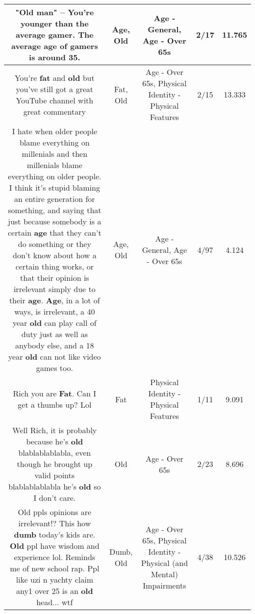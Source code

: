 \documentclass[11pt]{article}
\newlength\mylength
\begin{document}
\begin{center}
\begin{longtable}{|C{.65\mylength}|C{.30\mylength}|C{.12\mylength}|C{.12\mylength}|C{.12\mylength}|}
  \small "\textbf{Old} man" -- You're younger than the average gamer. The average \textbf{age} of gamers is around 35.\normalsize   & Age, Old & Age - General, Age - Over 65s & 2/17 & 11.765 \\  \hline
  \small You're \textbf{fat} and \textbf{old} but you've still got a great YouTube channel with great commentary\normalsize   & Fat, Old & Age - Over 65s, Physical Identity - Physical Features & 2/15 & 13.333 \\  \hline
  \small I hate when older people blame everything on millenials and then millenials blame everything on older people. I think it's stupid blaming an entire generation for something, and saying that just because somebody is a certain \textbf{age} that they can't do something or they don't know about how a certain thing works, or that their opinion is irrelevant simply due to their \textbf{age}. \textbf{Age}, in a lot of ways, is irrelevant, a 40 year \textbf{old} can play call of duty just as well as anybody else, and a 18 year \textbf{old} can not like video games too.\normalsize   & Age, Old & Age - General, Age - Over 65s & 4/97 & 4.124 \\  \hline
  \small Rich you are \textbf{Fat}. Can I get a thumbs up? Lol\normalsize   & Fat & Physical Identity - Physical Features & 1/11 & 9.091 \\  \hline
  \small Well Rich, it is probably because he's \textbf{old} blablablablabla, even though he brought up valid points blablablablabla he's \textbf{old} so I don't care.\normalsize   & Old & Age - Over 65s & 2/23 & 8.696 \\  \hline
  \small Old ppls opinions are irrelevant!? This how \textbf{dumb} today's kids are. \textbf{Old} ppl have wisdom and experience lol. Reminds me of new school rap. Ppl like uzi n yachty claim any1 over 25 is an \textbf{old} head... wtf\normalsize   & Dumb, Old & Age - Over 65s, Physical Identity - Physical (and Mental) Impairments & 4/38 & 10.526 \\  \hline

\end{longtable}
\end{center}
\end{document}
